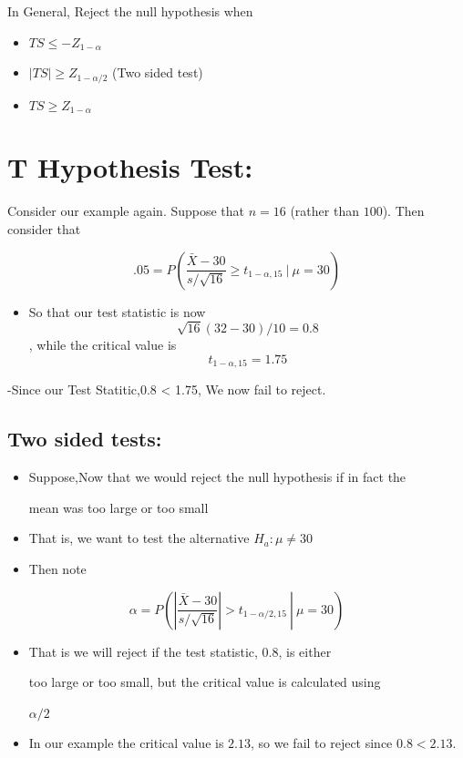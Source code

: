 \documentclass[]{article}
\providecommand{\tightlist}{%
  \setlength{\itemsep}{0pt}\setlength{\parskip}{0pt}}
\begin{document}
In General, Reject the null hypothesis when

\begin{itemize}
\tightlist
\item
  \(TS \leq -Z_{1 - \alpha}\)
\item
  \(|TS| \geq Z_{1 - \alpha / 2}\) (Two sided test)
\item
  \(TS \geq Z_{1 - \alpha}\)
\end{itemize}

\hypertarget{t-hypothesis-test}{%
\section{T Hypothesis Test:}\label{t-hypothesis-test}}

Consider our example again. Suppose that \(n= 16\) (rather than
\(100\)). Then consider that

\[.05 = P\left(\frac{\bar X - 30}{s / \sqrt{16}} \geq t_{1-\alpha, 15} ~|~ \mu = 30 \right)\]

\begin{itemize}
\tightlist
\item
  So that our test statistic is now \[\sqrt{16}(32 - 30) / 10 = 0.8 \],
  while the critical value is \[t_{1-\alpha, 15} = 1.75\]
\end{itemize}

-Since our Test Statitic,0.8 \textless{} 1.75, We now fail to reject.

\hypertarget{two-sided-tests}{%
\subsection{Two sided tests:}\label{two-sided-tests}}

\begin{itemize}
\item
  Suppose,Now that we would reject the null hypothesis if in fact the

  mean was too large or too small
\item
  That is, we want to test the alternative \(H_a : \mu \neq 30\)
\item
  Then note
\end{itemize}

\[ \alpha = P\left(\left. \left|\frac{\bar X - 30}{s /\sqrt{16}}\right| > t_{1-\alpha/2,15} ~\right|~ \mu = 30\right) \]

\begin{itemize}
\item
  That is we will reject if the test statistic, \(0.8\), is either

  too large or too small, but the critical value is calculated using

  \(\alpha / 2\)
\item
  In our example the critical value is \(2.13\), so we fail to reject
  since \(0.8 < 2.13\).
\end{itemize}
\end{document}
